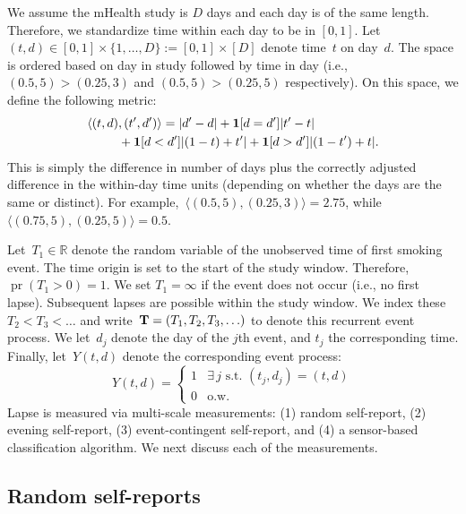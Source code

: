 \documentclass[11pt]{amsart}
\def\pr{\mathop{\text{pr}}\nolimits}
\def\pr{\mathop{\text{pr}}\nolimits}
\def\indicator{{\bf 1}}
\def\bfT{{\bf T}}
\begin{document}
We assume the mHealth study is $D$ days and each day is of the same
length. Therefore, we standardize time within each day to be in
$[0,1]$. Let $(t,d) \in [0,1] \times \{ 1,\ldots, D \} := [0,1] \times
[D]$ denote time~$t$ on day~$d$. The space is ordered based on day in
study followed by time in day (i.e., $(0.5, 5) > (0.25,3)$ and
$(0.5, 5) > (0.25, 5)$ respectively).  On this space, we define the
following metric:
\begin{align*}
\langle (t,d) &, (t^\prime, d^\prime ) \rangle = |d^\prime - d| +
\indicator [ d = d^\prime ] | t^\prime  - t | \\
&+ \indicator[ d < d^\prime ] | (1-t) + t^\prime | + \indicator[ d >
  d^\prime ] | (1-t^\prime) + t |.
\end{align*}
This is simply the difference in number of days plus the correctly
adjusted difference in the within-day time units (depending on whether
the days are the same or distinct).
For example,~$\langle (0.5, 5), (0.25, 3) \rangle = 2.75$, while
$\langle (0.75, 5), (0.25, 5) \rangle = 0.5$.

Let~$T_1 \in \mathbb{R}$ denote the random variable of the unobserved
time of first smoking event. The time origin is set to the start of
the study window.  Therefore,~$\pr (T_1 > 0 ) = 1$. We set $T_1 =
\infty$ if the event does not occur (i.e., no first lapse). Subsequent
lapses are possible within the study window. We index these~$T_{2} <
T_{3} < \ldots$ and write~$\bfT = (T_1, T_2, T_3,\ldots)$ to denote
this recurrent event process.  We let~$d_j$ denote the day of the
$j$th event, and $t_j$ the corresponding time.
Finally, let~$Y(t,d)$ denote the corresponding event process:
\[
  Y(t,d) = \left \{
    \begin{array}{cc}
      1 & \exists \, j \text{ s.t. } (t_j,d_j) = (t,d) \\
      0 & \text{o.w.} \end{array} \right .
\]
Lapse is measured via multi-scale measurements: (1) random
self-report, (2) evening self-report, (3) event-contingent
self-report, and (4) a sensor-based classification algorithm.
We next discuss each of the measurements.

\subsection{Random self-reports}
\label{section:randomEMAs}
\end{document}
